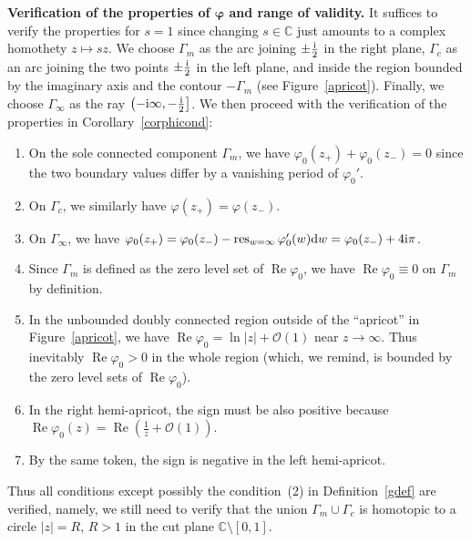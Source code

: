 \documentclass[10pt,a4paper]{amsart}
\numberwithin{equation}{section}
\theoremstyle{definition}
\def\le{\left}
\def\ri{\right}
\def \d{{\mathrm d}}
\def\res{\mathop{\mathrm {res}}}
\def\C{{\mathbb C}}
\def \Re{\operatorname{Re} }
\begin{document}
{\bf Verification of the properties of $\boldsymbol{\varphi}$ and range of validity.}
It suffices to verify the properties for $s=1$ since changing $s\in \C$ just amounts to a complex homothety $z\mapsto sz$.
We choose $\Gamma_m$ as the arc joining $\pm \frac {\rm i} 2$ in the right plane, $\Gamma_c$ as an arc joining the two points $\pm \frac {\rm i} 2$ in the left plane, and inside the region bounded by the imaginary axis and the contour $-\Gamma_m$ (see Figure~\ref{apricot}). Finally, we choose $\Gamma_\infty$ as the ray $\bigl(-{\rm i}\infty, -\frac {\rm i}2\bigr]$.
We then proceed with the verification of the properties in Corollary~\ref{corphicond}:
\begin{enumerate}\itemsep=0pt
\item[(1)] On the sole connected component $\Gamma_m$, we have $\varphi_0(z_+)+ \varphi_0(z_-)=0$ since the two boundary values differ by a vanishing period of $\varphi_0'$.
\item[(2)] On $\Gamma_c$, we similarly have $\varphi(z_+)=\varphi(z_-)$.
\item[(3)] On $\Gamma_\infty$, we have $\varphi_0(z_+) = \varphi_0(z_-) - \res_{w=\infty} \varphi_0'(w)\d w =\varphi_0(z_-)+4{\rm i}\pi $.
\item[(4)] Since $\Gamma_m$ is defined as the zero level set of $\Re \varphi_0$, we have $\Re \varphi_0\equiv 0$ on $\Gamma_m$ by definition.
\item[(5)] In the unbounded doubly connected region outside of the ``apricot'' in Figure~\ref{apricot}, we have $\Re \varphi_0 = \ln |z| + \mathcal O(1)$ near $z\to \infty$. Thus inevitably $\Re \varphi_0>0$ in the whole region (which, we remind, is bounded by the zero level sets of $\Re \varphi_0$).
\item[(5)] In the right hemi-apricot, the sign must be also positive because $\Re \varphi_0(z) = \Re\le(\frac 1 z+ \mathcal O(1)\ri)$.
\item[(6)] By the same token, the sign is negative in the left hemi-apricot.
\end{enumerate}
 Thus all conditions except possibly the condition~(2) in Definition~\ref{gdef} are verified, namely, we still need to verify that the union $\Gamma_m\cup \Gamma_c$ is homotopic to a circle $|z|=R$, $R>1$ in the cut plane $\C\setminus [0,1]$.
\end{document}
